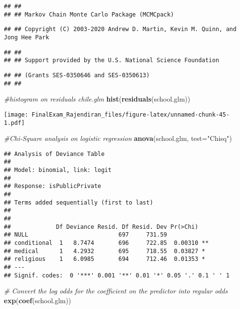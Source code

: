 \documentclass[]{article}
\newenvironment{Shaded}{\begin{snugshade}}{\end{snugshade}}
\newcommand{\CommentTok}[1]{\textcolor[rgb]{0.56,0.35,0.01}{\textit{#1}}}
\newcommand{\DataTypeTok}[1]{\textcolor[rgb]{0.13,0.29,0.53}{#1}}
\newcommand{\KeywordTok}[1]{\textcolor[rgb]{0.13,0.29,0.53}{\textbf{#1}}}
\newcommand{\NormalTok}[1]{#1}
\newcommand{\StringTok}[1]{\textcolor[rgb]{0.31,0.60,0.02}{#1}}
\begin{document}
\begin{verbatim}
## ##
## ## Markov Chain Monte Carlo Package (MCMCpack)
\end{verbatim}

\begin{verbatim}
## ## Copyright (C) 2003-2020 Andrew D. Martin, Kevin M. Quinn, and Jong Hee Park
\end{verbatim}

\begin{verbatim}
## ##
## ## Support provided by the U.S. National Science Foundation
\end{verbatim}

\begin{verbatim}
## ## (Grants SES-0350646 and SES-0350613)
## ##
\end{verbatim}

\begin{Shaded}
\begin{Highlighting}[]
\CommentTok{#histogram on residuals chile.glm}
\KeywordTok{hist}\NormalTok{(}\KeywordTok{residuals}\NormalTok{(school.glm))}
\end{Highlighting}
\end{Shaded}

\texttt{[image: FinalExam\_Rajendiran\_files/figure-latex/unnamed-chunk-45-1.pdf]}

\begin{Shaded}
\begin{Highlighting}[]
\CommentTok{#Chi-Square analysis on logistic regression}
\KeywordTok{anova}\NormalTok{(school.glm, }\DataTypeTok{test=}\StringTok{"Chisq"}\NormalTok{)}
\end{Highlighting}
\end{Shaded}

\begin{verbatim}
## Analysis of Deviance Table
## 
## Model: binomial, link: logit
## 
## Response: isPublicPrivate
## 
## Terms added sequentially (first to last)
## 
## 
##             Df Deviance Resid. Df Resid. Dev Pr(>Chi)   
## NULL                          697     731.59            
## conditional  1   8.7474       696     722.85  0.00310 **
## medical      1   4.2932       695     718.55  0.03827 * 
## religious    1   6.0985       694     712.46  0.01353 * 
## ---
## Signif. codes:  0 '***' 0.001 '**' 0.01 '*' 0.05 '.' 0.1 ' ' 1
\end{verbatim}

\begin{Shaded}
\begin{Highlighting}[]
\CommentTok{# Convert the log odds for the coefficient on the predictor into regular odds}
\KeywordTok{exp}\NormalTok{(}\KeywordTok{coef}\NormalTok{(school.glm))}
\end{Highlighting}
\end{Shaded}
\end{document}
